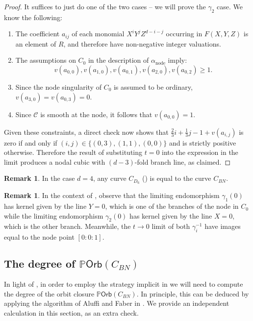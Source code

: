 \documentclass[12 pt, reqno]{amsart}
\theoremstyle{definition}
\newtheorem{rmk}[thm]{Remark}
\newcommand{\on}{\operatorname}
\newcommand{\mb}{\mathbb}
\renewcommand{\P}{\mb{P}}
\newcommand{\Orb}{\mathsf{Orb}}
\begin{document}
\begin{proof}
  It suffices to just do one of the two cases -- we will prove the
  $\gamma_{2}$ case. We know the following:
  \begin{enumerate}
  \item The coefficient $a_{ij}$ of each monomial $X^iY^jZ^{d-i-j}$
    occurring in $F(X,Y,Z)$ is an element of $R$, and therefore have
    non-negative integer valuations.

  \item The assumptions on $C_0$ in the description of
    $\alpha_{\on{node}}$ imply:
    $$v(a_{0,0}),v(a_{1,0}),v(a_{0,1}),v(a_{2,0}),v(a_{0,2})\geq 1.$$

  \item Since the node singularity of $C_0$ is assumed to be ordinary,
    $v(a_{3,0})=v(a_{0,3})=0$.

  \item Since $\mathscr{C}$ is smooth at the node, it follows that
    $v(a_{0,0})=1$.
  \end{enumerate}

  Given these constraints, a direct check now shows that
  $\frac{2}{3}i+\frac{1}{3}j-1+v(a_{i,j})$ is zero if and only if
  $(i,j)\in \{(0,3),(1,1),(0,0)\}$ and is strictly positive otherwise.
  Therefore the result of substituting $t=0$ into the expression in
  the limit produces a nodal cubic with $(d-3)$-fold branch line, as
  claimed.
\end{proof}

\begin{rmk}
  \label{D6CBN}
  In the case $d=4$, any curve $C_{D_{6}}$ ()
  is equal to the curve $C_{BN}$.
\end{rmk}

\begin{rmk}
  \label{rmk:limitendoNode}
  In the context of , observe that the limiting
  endomorphism $\gamma_{1}(0)$ has kernel given by the line $Y=0$,
  which is one of the branches of the node in $C_0$ while the limiting
  endomorphism $\gamma_{2}(0)$ has kernel given by the line $X=0$,
  which is the other branch.  Meanwhile, the $t \to 0$ limit of both
  $\gamma_{i}^{-1}$ have images equal to the node point $[0:0:1]$.
\end{rmk}

\subsection{The degree of $\P \Orb(C_{BN})$}
In light of , in order to employ the strategy implicit
in  we will need to compute the degree of the orbit
closure $\P \Orb(C_{BN})$.  In principle, this can be deduced by
applying the algorithm of Aluffi and Faber in \cite{AF00}.  We provide
an independent calculation in this section, as an extra check.
\end{document}
